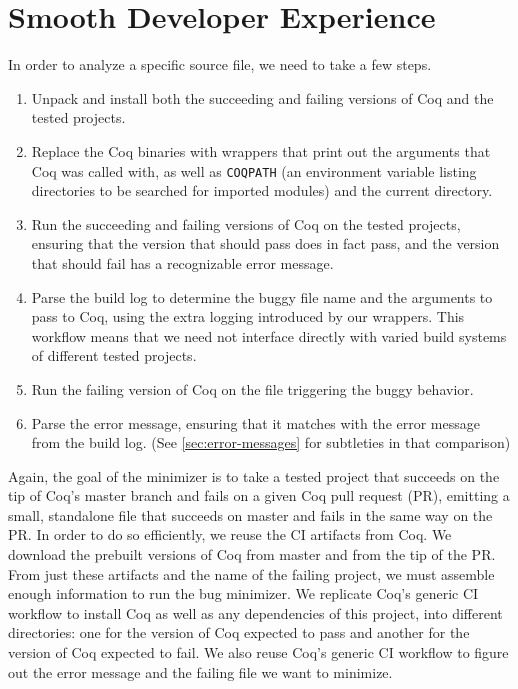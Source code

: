 \documentclass[a4paper,USenglish,cleveref,autoref,thm-restate,pdfa]{lipics-v2021}
\begin{document}
\section{Smooth Developer Experience}\label{sec:smooth-dev-experience}

In order to analyze a specific source file, we need to take a few steps.
\begin{enumerate}
\item Unpack and install both the succeeding and failing versions of Coq and the tested projects.
\item Replace the Coq binaries with wrappers that print out the arguments that Coq was called with, as well as \texttt{COQPATH} (an environment variable listing directories to be searched for imported modules) and the current directory.
\item Run the succeeding and failing versions of Coq on the tested projects, ensuring that the version that should pass does in fact pass, and the version that should fail has a recognizable error message.
\item Parse the build log to determine the buggy file name and the arguments to pass to Coq, using the extra logging introduced by our wrappers.
  This workflow means that we need not interface directly with varied build systems of different tested projects.
\item Run the failing version of Coq on the file triggering the buggy behavior.
\item Parse the error message, ensuring that it matches with the error message from the build log.
  (See \autoref{sec:error-messages} for subtleties in that comparison)
\end{enumerate}

Again, the goal of the minimizer is to take a tested project that succeeds on the tip of Coq's master branch and fails on a given Coq pull request (PR), emitting a small, standalone file that succeeds on master and fails in the same way on the PR.
In order to do so efficiently, we reuse the CI artifacts from Coq.
We download the prebuilt versions of Coq from master and from the tip of the PR.
From just these artifacts and the name of the failing project, we must assemble enough information to run the bug minimizer.
We replicate Coq's generic CI workflow to install Coq as well as any dependencies of this project, into different directories: one for the version of Coq expected to pass and another for the version of Coq expected to fail.
We also reuse Coq's generic CI workflow to figure out the error message and the failing file we want to minimize.
\end{document}
